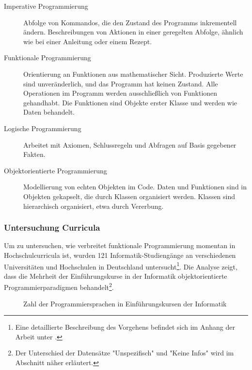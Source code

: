 \begin{description}
    \item[Imperative Programmierung] Abfolge von Kommandos, die den Zustand des Programms inkrementell ändern. Beschreibungen von Aktionen in einer geregelten Abfolge, ähnlich wie bei einer Anleitung oder einem Rezept.
    \item[Funktionale Programmierung] Orientierung an Funktionen aus mathematischer Sicht. Produzierte Werte sind unveränderlich, und das Programm hat keinen Zustand. Alle Operationen im Programm werden ausschließlich von Funktionen gehandhabt. Die Funktionen sind Objekte erster Klasse und werden wie Daten behandelt.
    \item[Logische Programmierung] Arbeitet mit Axiomen, Schlussregeln und Abfragen auf Basis gegebener Fakten.
    \item[Objektorientierte Programmierung] Modellierung von echten Objekten im Code. Daten und Funktionen sind in Objekten gekapselt, die durch Klassen organisiert werden. Klassen sind hierarchisch organisiert, etwa durch Vererbung.
\end{description}

\subsubsection{Untersuchung Curricula}\label{sec:curriculares}
Um zu untersuchen, wie verbreitet funktionale Programmierung momentan in Hochschulcurricula ist, wurden 121 Informatik-Studiengänge an verschiedenen Universitäten und Hochschulen in Deutschland untersucht\footnote{Eine detaillierte Beschreibung des Vorgehens befindet sich im Anhang der Arbeit unter .}.
Die Analyse zeigt, dass die Mehrheit der Einführungskurse in der Informatik objektorientierte Programmierparadigmen behandelt\footnote{Der Unterschied der Datensätze "Unspezifisch" und "Keine Infos" wird im Abschnitt  näher erläutert.}.

\begin{figure}[H]
    \centering
    
    \caption{Zahl der Programmiersprachen in Einführungskursen der Informatik}
\end{figure}

